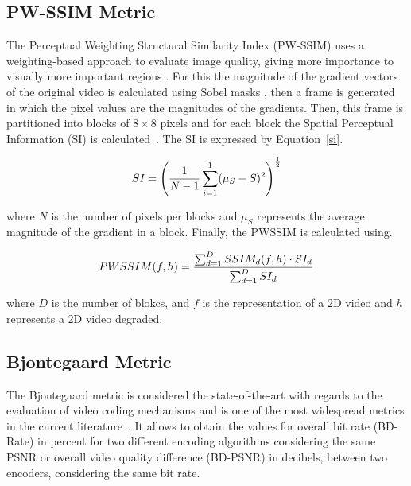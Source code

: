 \documentclass[journal]{IEEEtran}
\begin{document}
\subsection{PW-SSIM Metric}

The Perceptual Weighting Structural Similarity Index (PW-SSIM) uses a weighting-based approach to evaluate image quality, giving more importance to visually more important regions \cite{danilo:15a}. For this the magnitude of the gradient vectors of the original video is calculated using Sobel masks \cite{furnari:15}, then a frame is generated in which the pixel values are the magnitudes of the gradients. Then, this frame is partitioned into blocks of $8 \times 8$ pixels and for each block the Spatial Perceptual Information (SI) is calculated~\cite{jean:15}. The SI is expressed by Equation~\ref{si}.

\begin{equation}
	\centering
	\label{si}
	SI = \left ( \frac{1}{N-1}\sum_{i=1}^{1}(\mu_{S}-S)^{2} \right )^{\frac{1}{2}}
\end{equation}

\noindent where $N$ is the number of pixels per blocks and $\mu_{S}$ represents the average magnitude of the gradient in a block. Finally, the PWSSIM is calculated using.

\begin{equation}
	\centering
	\label{pwssim}
	PWSSIM(f,h)= \frac{\sum_{d=1}^{D}SSIM_{d}(f,h)\cdot SI_{d}}{\sum_{d=1}^{D}SI_{d}}		
\end{equation}

\noindent  where $D$ is the number of blokcs, and $f$ is the representation of a 2D video and $h$ represents a 2D video degraded.


\subsection{Bjontegaard Metric}

The Bjontegaard metric is considered the state-of-the-art with regards to the evaluation of video coding mechanisms and is one of the most widespread metrics in the current literature~\cite{Bjontegaard:01}\cite{Mathias}. It allows to obtain the values for overall bit rate (BD-Rate) in percent for two different encoding algorithms considering the same PSNR or overall video quality difference (BD-PSNR) in decibels, between two encoders, considering the same bit rate. %
\end{document}
